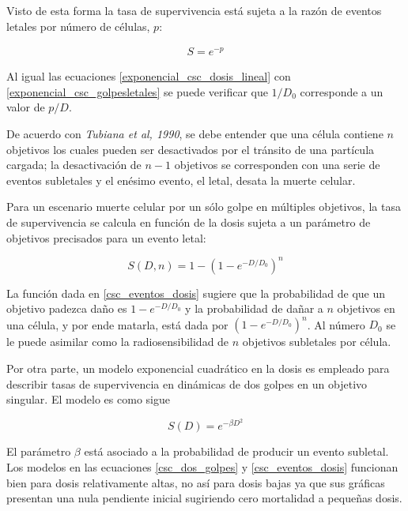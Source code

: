 \documentclass[12pt,letterpaper, oneside]{book}
\begin{document}
			Visto de esta forma la tasa de supervivencia está sujeta a la razón de eventos letales por número de células, $p$:
			
			\begin{eqnarray}
				S=e^{-p} \label{exponencial_csc_golpesletales}
			\end{eqnarray}
			
			Al igual las ecuaciones \ref{exponencial_csc_dosis_lineal} con \ref{exponencial_csc_golpesletales} se puede verificar que $1/D_0$ corresponde a un valor de $p/D$\cite{Tubiana.1990}.
			
			De acuerdo con \textit{Tubiana et al, 1990}, se debe entender que una célula contiene $n$ objetivos los cuales pueden ser desactivados por el tránsito de una partícula cargada; la desactivación de $n-1$ objetivos se corresponden con una serie de eventos subletales y el enésimo evento, el letal, desata la muerte celular. 
			
			Para un escenario muerte celular por un sólo golpe en múltiples objetivos, la tasa de supervivencia se calcula en función de la dosis sujeta a un parámetro de objetivos precisados para un evento letal:
			
			\begin{equation}
			S(D,n)=1-\left(1-e^{-D/D_0}\right)^n \label{csc_eventos_dosis}
			\end{equation}
			
			La función dada en \ref{csc_eventos_dosis} sugiere que la probabilidad de que un objetivo padezca daño es $1-e^{-D/D_0}$ y la probabilidad de dañar a $n$ objetivos en una célula, y por ende matarla, está dada por $(1-e^{-D/D_0})^n$\cite{Tubiana.1990}. Al número $D_0$ se le puede asimilar como la radiosensibilidad de $n$ objetivos subletales por célula\cite{Mayles.2007, Tubiana.1990}.  
			
			Por otra parte, un modelo exponencial cuadrático en la dosis es empleado para describir tasas de supervivencia en dinámicas de dos golpes en un objetivo singular\cite{Tubiana.1990}. El modelo es como sigue
			
			\begin{equation}
				S(D)=e^{-\beta D^2} \label{csc_dos_golpes}
			\end{equation}
			
			El parámetro $\beta$ está asociado a la probabilidad de producir un evento subletal\cite{Bleehen.2007, Tubiana.1990}. Los modelos en las ecuaciones \ref{csc_dos_golpes} y \ref{csc_eventos_dosis} funcionan bien para dosis relativamente altas, no así para dosis bajas ya que sus gráficas presentan una nula pendiente inicial sugiriendo cero mortalidad a pequeñas dosis\cite{Tubiana.1990}.  
			
\end{document}
